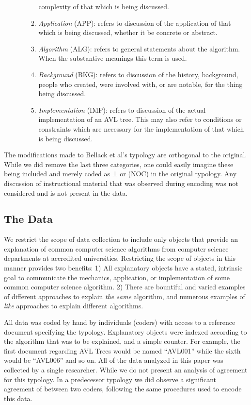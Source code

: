 \documentclass[conference]{IEEEtran}
\begin{document}
\begin{enumerate}[M1.]
\begin{enumerate}
\begin{enumerate}
            complexity of that which is being discussed. 
          \item \emph{Application} (APP): refers to discussion of the application of
            that which is being discussed, whether it be concrete or abstract.
          \item \emph{Algorithm} (ALG): refers to general statements about the
            algorithm. When the 
            substantive meanings this term is used.
          \item \emph{Background} (BKG): refers to discussion of the history,
            background, people who created, were involved with, or are notable,
            for the thing being discussed.
          \item \emph{Implementation} (IMP): refers to discussion of the actual
            implementation of an AVL tree. This may also refer to conditions or
            constraints which are necessary for the implementation of that which
            is being discussed.
       \end{enumerate}
    \end{enumerate}
\end{enumerate}

The modifications made to Bellack et al's typology are orthogonal to the
original. While we did remove the last three categories, one could easily
imagine these being included and merely coded as $\bot$ or (NOC) in the original
typology. Any discussion of instructional material that was observed during
encoding was not considered and is not present in the data.

\subsection{The Data}
We restrict the scope of data collection to include only objects that provide an
explanation of common computer science algorithms from computer
science departments at accredited universities. Restricting the scope of objects
in this manner provides two benefits: 1) All explanatory objects have a stated,
intrinsic goal to communicate the mechanics, application, or implementation of
some common computer science algorithm. 2) There are bountiful and varied
examples of different approaches to explain \emph{the same} algorithm, and numerous
examples of \emph{like} approaches to explain different algorithms.

All data was coded by hand by individuals (coders) with access to a reference
document specifying the typology. Explanatory objects were indexed according to
the algorithm that was to be explained, and a simple counter. For example, the
first document regarding AVL Trees would be named ``AVL001'' while the sixth
would be ``AVL006'' and so on. All of the data analyzed in this paper was
collected by a single researcher. While we do not present an analysis of
agreement for this typology. In a predecessor typology we did observe a
significant agreement of  between two coders,
following the same procedures used to encode this data.
\end{document}
